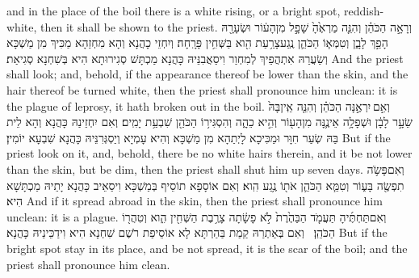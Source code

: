 {and in the place of the boil there is a white rising, or a bright spot, reddish-white, then it shall be shown to the priest.}{}
{וְרָאָ֣ה הַכֹּהֵ֗ן וְהִנֵּ֤ה מַרְאֶ֙הָ֙ שָׁפָ֣ל מִן\maqqaf הָע֔וֹר וּשְׂעָרָ֖הּ הָפַ֣ךְ לָבָ֑ן וְטִמְּא֧וֹ הַכֹּהֵ֛ן נֶֽגַע\maqqaf צָרַ֥עַת הִ֖וא בַּשְּׁחִ֥ין פָּרָֽחָה׃}
{וְיִחְזֵי כָהֲנָא וְהָא מִחְזַהָא מַכִּיךְ מִן מַשְׁכָּא וְשַׂעֲרַהּ אִתְהֲפֵיךְ לְמִחְוַר וִיסַאֲבִנֵּיהּ כָּהֲנָא מַכְתָּשׁ סְגִירוּתָא הִיא בְּשִׁחְנָא סְגִיאַת׃}
{And the priest shall look; and, behold, if the appearance thereof be lower than the skin, and the hair thereof be turned white, then the priest shall pronounce him unclean: it is the plague of leprosy, it hath broken out in the boil.}{}
{וְאִ֣ם \legarmeh  יִרְאֶ֣נָּה הַכֹּהֵ֗ן וְהִנֵּ֤ה אֵֽין\maqqaf בָּהּ֙ שֵׂעָ֣ר לָבָ֔ן וּשְׁפָלָ֥ה אֵינֶ֛נָּה מִן\maqqaf הָע֖וֹר וְהִ֣יא כֵהָ֑ה וְהִסְגִּיר֥וֹ הַכֹּהֵ֖ן שִׁבְעַ֥ת יָמִֽים׃}
{וְאִם יִחְזֵינַהּ כָּהֲנָא וְהָא לֵית בַּהּ שְׂעַר חִוָּר וּמַכִּיכָא לָיְתַהָא מִן מַשְׁכָּא וְהִיא עָמְיָא וְיַסְגְּרִנֵּיהּ כָּהֲנָא שִׁבְעָא יוֹמִין׃}
{But if the priest look on it, and, behold, there be no white hairs therein, and it be not lower than the skin, but be dim, then the priest shall shut him up seven days.}{}
{וְאִם\maqqaf פָּשֹׂ֥ה תִפְשֶׂ֖ה בָּע֑וֹר וְטִמֵּ֧א הַכֹּהֵ֛ן אֹת֖וֹ נֶ֥גַע הִֽוא׃}
{וְאִם אוֹסָפָא תוֹסֵיף בְּמַשְׁכָּא וִיסַאֵיב כָּהֲנָא יָתֵיהּ מַכְתָּשָׁא הִיא׃}
{And if it spread abroad in the skin, then the priest shall pronounce him unclean: it is a plague.}{}
{וְאִם\maqqaf תַּחְתֶּ֜יהָ תַּעֲמֹ֤ד הַבַּהֶ֙רֶת֙ לֹ֣א פָשָׂ֔תָה צָרֶ֥בֶת הַשְּׁחִ֖ין הִ֑וא וְטִהֲר֖וֹ הַכֹּהֵֽן׃ \setuma }
{וְאִם בְּאַתְרַהּ קַמַת בַּהַרְתָּא לָא אוֹסֵיפַת רֹשֶׁם שִׁחְנָא הִיא וִידַכֵּינֵיהּ כָּהֲנָא׃}
{But if the bright spot stay in its place, and be not spread, it is the scar of the boil; and the priest shall pronounce him clean.}{}
